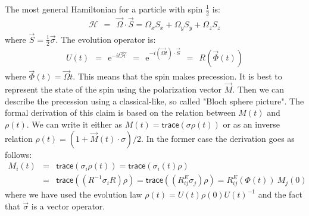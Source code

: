 \documentclass[onecolumn,fleqn, 11pt]{revtex4}
\newcommand{\trc}{\mathsf{trace}}
\newcommand{\eexp}{\mathrm{e}^}
\newcommand{\beq}{\begin{eqnarray}}
\newcommand{\eeq}{\end{eqnarray}}
\begin{document}
The most general Hamiltonian for a particle with spin $\frac{1}{2}$ is:
\beq
\mathcal{H} \ \ = \ \ \vec{\Omega}\cdot \vec{S}= \Omega_x S_x + \Omega_y S_y + \Omega_z S_z 
\eeq
where ${\vec{S} = \frac{1}{2} \vec{\sigma}}$.
The evolution operator is:
\beq
U(t) \ \ = \ \ \eexp{-it\hat{\mathcal{H}}} \ \ = \ \ \eexp{-i( \vec{\Omega}t)\cdot\vec{S}} \ \ = \ \ R(\vec{\Phi }(t)) 
\eeq
where $\vec{\Phi}(t) = \vec{\Omega}t$. 
This means that the spin makes precession.
It is best to represent the state of the spin 
using the polarization vector $\vec{M}$. 
Then we can describe the precession  
using a classical-like, so called "Bloch sphere picture". 
The formal derivation of this claim is based on the 
relation between $M(t)$ and $\rho(t)$. 
We can write it either as $M(t)=\trc(\sigma\rho(t))$
or as an inverse relation ${\rho(t)=(1+\vec{M}(t)\cdot\sigma)/2}$. 
In the former case the derivation goes as follows:
\beq
M_i(t)&=&\trc(\sigma_i\rho(t)) 
= \trc(\sigma_i(t)\rho) 
\\ \nonumber
&=& \trc((R^{-1} \sigma_i R) \rho) 
= \trc((R^E_{ij} \sigma_j) \rho) 
=  R^E_{ij}(\Phi(t)) \ M_j(0)
\eeq
where we have used the evolution law ${\rho(t)=U(t)\rho(0)U(t)^{-1}}$
and the fact that $\vec{\sigma}$ is a vector operator. 
\end{document}
